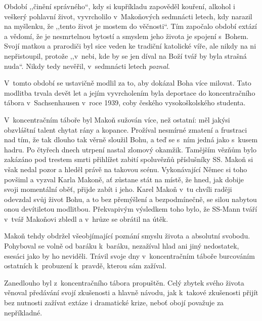 
Období ,,činění správného``, kdy si kupříkladu zapověděl kouření, alkohol i
veškerý pohlavní život, vyvrcholilo v~Makoňových sedmnácti letech, kdy
narazil na myšlenku, že ,,tento život je mostem do věčnosti``. Tím započalo období
extází a vědomí, že je nesmrtelnou bytostí a smyslem jeho života je spojení
s~Bohem. Svojí matkou a prarodiči byl sice veden ke tradiční katolické víře, ale
nikdy na ni nepřistoupil, protože ,,v~nebi, kde by se jen díval na Boží tvář by
byla strašná nuda``. Nikdy tedy nevěřil, v~sedmnácti letech {\em poznal}.

V~tomto období se ustavičně modlil za to, aby dokázal Boha více milovat. Tato
modlitba trvala devět let a jejím vyvrcholením byla deportace do koncentračního
tábora v~Sachsenhausen v~roce 1939, coby českého vysokoškolského studenta.

V~koncentračním táboře byl Makoň sužován více, než ostatní: měl jakýsi
obzvláštní talent chytat rány a kopance. Prožíval nesmírné zmatení a frustraci
nad tím, že tak dlouho tak věrně sloužil Bohu, a teď se s~ním jedná jako s~kusem
hadru. Po čtyřech dnech utrpení nastal zlomový okamžik. Tamějším vězňům bylo
zakázáno pod trestem smrti přihlížet zabití spoluvězňů příslušníky SS. Makoň si
však nedal pozor a hleděl právě na takovou scénu. Vykonávající Němec si toho
povšiml a vyzval Karla Makoně, ať zůstane stát na místě, že hned, jak dobije
svoji momentální oběť, přijde zabít i jeho. Karel Makoň v~tu chvíli raději
odevzdal svůj život Bohu, a to bez přemýšlení a bezpodmínečně, se silou nabytou
onou devítiletou modlitbou. Překvapivým výsledkem toho bylo, že SS-Mann tváří
v~tvář Makoňovi zbledl a v~hrůze se obrátil na útěk.

Makoň tehdy obdržel všeobjímající poznání smyslu života
a absolutní svobodu. Pohyboval se volně od baráku k~baráku, nezažíval hlad ani
jiný nedostatek, esesáci jako by ho neviděli. Trávil svoje dny v~koncentračním táboře
burcováním ostatních k~probuzení k~pravdě, kterou sám zažíval.

Zanedlouho byl z~koncentračního tábora propuštěn. Celý zbytek svého života
věnoval předávání svojí zkušenosti a hlavně návodu, jak k~takové zkušenosti
přijít bez nutnosti zažívat extáze i dramatické krize, neboť obojí považuje za
nepříkladné.

